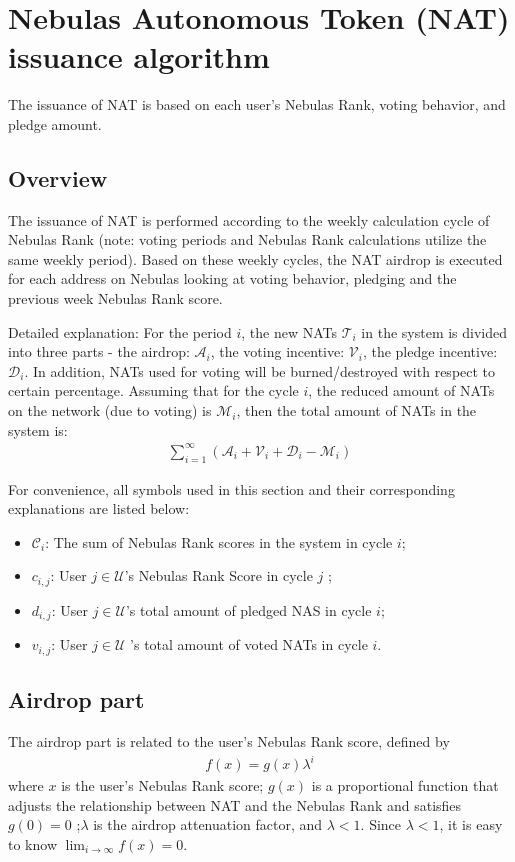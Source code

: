 \section{Nebulas Autonomous Token (NAT) ​​issuance algorithm}

The issuance of NAT is based on each user's Nebulas Rank, voting behavior, and pledge amount.

\subsection{Overview}
The issuance of NAT is performed according to the weekly calculation cycle of Nebulas Rank (note: voting periods and Nebulas Rank calculations utilize the same weekly period). Based on these weekly cycles, the NAT airdrop is executed for each address on Nebulas looking at voting behavior, pledging and the previous week Nebulas Rank score.

Detailed explanation: 
For the period $i$, the new NATs $\mathcal{T}_i$ in the system is divided into three parts - the airdrop: $\mathcal{A}_i$, the voting incentive: $\mathcal{V}_i$, the pledge incentive: $\mathcal{D}_i$.
In addition, NATs used for voting will be burned/destroyed with respect to certain percentage. Assuming that for the cycle $i$, the reduced amount of NATs on the network (due to voting) is $\mathcal{M}_i$, then the total amount of NATs in the system is:
\begin{align}
\sum_{i=1}^{\infty} (\mathcal{A}_i + \mathcal{V}_i + \mathcal{D}_i - \mathcal{M}_i)
\end{align}

For convenience, all symbols used in this section and their corresponding explanations are listed below:
\begin{itemize}
\item $\mathcal{C}_i$: The sum of Nebulas Rank scores in the system in  cycle $i$;
\item $c_{i,j}$: User $j \in \mathcal{U}$'s Nebulas Rank Score in cycle $j$ ;
\item $d_{i,j}$: User $j \in \mathcal{U}$'s total amount of pledged NAS in cycle $i$;
\item $v_{i,j}$: User $j \in \mathcal{U}$ 's total amount of voted NATs  in cycle $i$.
\end{itemize}

\subsection{Airdrop part}
The airdrop part is related to the user's Nebulas Rank score, defined by 
\begin{align}
    f(x) = g(x)\lambda^i
\end{align}
\noindent where $x$ is the user's Nebulas Rank score; $g(x)$ is a proportional function that adjusts the relationship between NAT and the Nebulas Rank and satisfies $g(0) = 0$ ;$\lambda$ is the airdrop attenuation factor, and $\lambda < 1$.
Since $\lambda < 1$, it is easy to know $\lim_{i\to \infty}f(x) = 0$.

